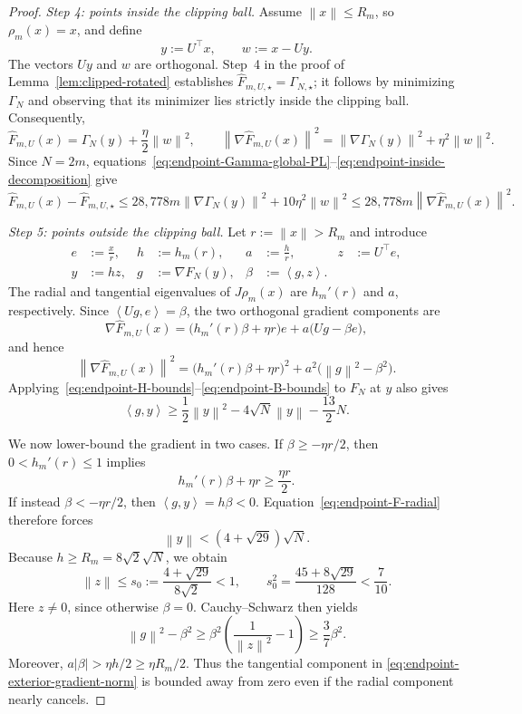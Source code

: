 \documentclass[10pt,a4paper]{amsart}
\newcommand{\ip}[2]{\left\langle #1,#2\right\rangle}
\newcommand{\norm}[1]{\left\lVert #1\right\rVert}
\begin{document}
\begin{proof}
\emph{Step 4: points inside the clipping ball.}
Assume $\norm{x}\le R_m$, so $\rho_m(x)=x$, and define
\[
y:=U^\top x,
\qquad
w:=x-Uy.
\]
The vectors $Uy$ and $w$ are orthogonal. Step~4 in the proof of Lemma~\ref{lem:clipped-rotated} establishes
$\widehat F_{m,U,\star}=\Gamma_{N,\star}$; it follows by minimizing $\Gamma_N$ and observing that its minimizer lies
strictly inside the clipping ball. Consequently,
\begin{equation}
\label{eq:endpoint-inside-decomposition}
\widehat F_{m,U}(x)
=\Gamma_N(y)+\frac{\eta}{2}\norm{w}^2,
\qquad
\norm{\nabla\widehat F_{m,U}(x)}^2
=\norm{\nabla\Gamma_N(y)}^2+\eta^2\norm{w}^2.
\end{equation}
Since $N=2m$, equations~\eqref{eq:endpoint-Gamma-global-PL}--\eqref{eq:endpoint-inside-decomposition} give
\[
\widehat F_{m,U}(x)-\widehat F_{m,U,\star}
\le
28{,}778m\norm{\nabla\Gamma_N(y)}^2+10\eta^2\norm{w}^2
\le
28{,}778m\norm{\nabla\widehat F_{m,U}(x)}^2.
\]

\emph{Step 5: points outside the clipping ball.}
Let $r:=\norm{x}>R_m$ and introduce
\begin{align*}
e&:=\frac{x}{r},
&
h&:=h_m(r),
&
a&:=\frac{h}{r},
&
z&:=U^\top e,\\
y&:=hz,
&
g&:=\nabla F_N(y),
&
\beta&:=\ip{g}{z}.
\end{align*}
The radial and tangential eigenvalues of $J\rho_m(x)$ are $h_m'(r)$ and $a$, respectively. Since
$\ip{Ug}{e}=\beta$, the two orthogonal gradient components are
\begin{equation}
\label{eq:endpoint-exterior-gradient}
\nabla\widehat F_{m,U}(x)
=
\bigl(h_m'(r)\beta+\eta r\bigr)e
+a\bigl(Ug-\beta e\bigr),
\end{equation}
and hence
\begin{equation}
\label{eq:endpoint-exterior-gradient-norm}
\norm{\nabla\widehat F_{m,U}(x)}^2
=
\bigl(h_m'(r)\beta+\eta r\bigr)^2
+a^2\bigl(\norm{g}^2-\beta^2\bigr).
\end{equation}
Applying~\eqref{eq:endpoint-H-bounds}--\eqref{eq:endpoint-B-bounds} to $F_N$ at $y$ also gives
\begin{equation}
\label{eq:endpoint-F-radial}
\ip{g}{y}
\ge
\frac12\norm{y}^2-4\sqrt N\norm{y}-\frac{13}{2}N.
\end{equation}

We now lower-bound the gradient in two cases. If $\beta\ge-\eta r/2$, then $0<h_m'(r)\le1$ implies
\[
h_m'(r)\beta+\eta r\ge\frac{\eta r}{2}.
\]
If instead $\beta<-\eta r/2$, then $\ip{g}{y}=h\beta<0$. Equation~\eqref{eq:endpoint-F-radial} therefore forces
\[
\norm{y}<(4+\sqrt{29})\sqrt N.
\]
Because $h\ge R_m=8\sqrt2\sqrt N$, we obtain
\[
\norm{z}\le s_0:=\frac{4+\sqrt{29}}{8\sqrt2}<1,
\qquad
s_0^2=\frac{45+8\sqrt{29}}{128}<\frac{7}{10}.
\]
Here $z\ne0$, since otherwise $\beta=0$. Cauchy--Schwarz then yields
\[
\norm{g}^2-\beta^2
\ge
\beta^2\left(\frac{1}{\norm{z}^2}-1\right)
\ge
\frac{3}{7}\beta^2.
\]
Moreover, $a|\beta|>\eta h/2\ge\eta R_m/2$. Thus the tangential component in
\eqref{eq:endpoint-exterior-gradient-norm} is bounded away from zero even if the radial component nearly cancels.


\end{proof}
\end{document}
